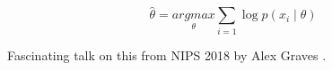 \begin{equation}
    \hat{\theta} = \underset{\theta}{argmax} \sum_{i=1} \log p(x_i \mid \theta)
\end{equation}

Fascinating talk on this from NIPS 2018 by Alex Graves \cite{nips-talk}. 







 
 
 



